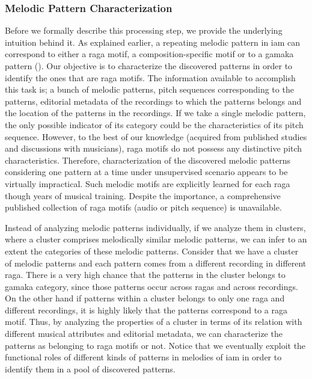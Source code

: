 {\subsubsection{Melodic Pattern Characterization}
\label{pattern_characterization}

Before we formally describe this processing step, we provide the underlying intuition behind it. As explained earlier, a repeating melodic pattern in \gls{iam} can correspond to either a \gls{raga} motif, a composition-specific motif or to a \gls{gamaka} pattern (). Our objective is to characterize the discovered patterns in order to identify the ones that are \gls{raga} motifs. The information available to accomplish this task is; a bunch of melodic patterns, pitch sequences corresponding to the patterns, editorial metadata of the recordings to which the patterns belongs and the location of the patterns in the recordings. If we take a single melodic pattern, the only possible indicator of its category could be the characteristics of its pitch sequence. However, to the best of our knowledge (acquired from published studies and discussions with musicians), \gls{raga} motifs do not possess any distinctive pitch characteristics. Therefore, characterization of the discovered melodic patterns considering one pattern at a time under unsupervised scenario appears to be virtually impractical. Such melodic motifs are explicitly learned for each \gls{raga} though years of musical training. Despite the importance, a comprehensive published collection of \gls{raga} motifs (audio or pitch sequence) is unavailable. 

Instead of analyzing melodic patterns individually, if we analyze them in clusters, where a cluster comprises melodically similar melodic patterns, we can infer to an extent the categories of these melodic patterns. Consider that we have a cluster of melodic patterns and each pattern comes from a different recording in different \gls{raga}. There is a very high chance that the patterns in the cluster belongs to \gls{gamaka} category, since those patterns occur across \glspl{raga} and across recordings. On the other hand if patterns within a cluster belongs to only one \gls{raga} and different recordings, it is highly likely that the patterns correspond to a \gls{raga} motif. Thus, by analyzing the properties of a cluster in terms of its relation with different musical attributes and editorial metadata, we can characterize the patterns as belonging to \gls{raga} motifs or not. Notice that we eventually exploit the functional roles of different kinds of patterns in melodies of \gls{iam} in order to identify them in a pool of discovered patterns. 

}
